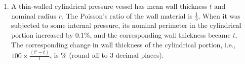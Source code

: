 \documentclass[journal,12pt,onecolumn]{IEEEtran}
\theoremstyle{remark}
\begin{document}
\begin{enumerate}
   

    \item A thin-walled cylindrical pressure vessel has mean wall thickness $t$ and nominal radius $r$. The Poisson's ratio of the wall material is $\frac{1}{3}$. When it was subjected to some internal pressure, its nominal perimeter in the cylindrical portion increased by $0.1\%$, and the corresponding wall thickness became $\bar{t}$. The corresponding change in wall thickness of the cylindrical portion, i.e., $100 \times \frac{(t' - t)}{t}$, is {\underline{\hspace{2cm}}}\% (round off to 3 decimal places).

\end{enumerate}
\end{document}

